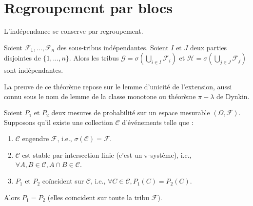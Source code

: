 \section{Regroupement par blocs}
L'indépendance se conserve par regroupement.
\begin{theorem}
Soient $\mathcal{F}_1, \ldots, \mathcal{F}_n$ des sous-tribus indépendantes. Soient $I$ et $J$ deux parties disjointes de $\{1, \ldots, n\}$. Alors les tribus $\mathcal{G} = \sigma(\bigcup_{i \in I} \mathcal{F}_i)$ et $\mathcal{H} = \sigma(\bigcup_{j \in J} \mathcal{F}_j)$ sont indépendantes.
\end{theorem}
La preuve de ce théorème repose sur le lemme d'unicité de l'extension, aussi connu sous le nom de lemme de la classe monotone ou théorème $\pi-\lambda$ de Dynkin.
\begin{lemma}
Soient $P_1$ et $P_2$ deux mesures de probabilité sur un espace mesurable $(\Omega, \mathcal{F})$. Supposons qu'il existe une collection $\mathcal{C}$ d'événements telle que :
\begin{enumerate}
    \item[i)] $\mathcal{C}$ engendre $\mathcal{F}$, i.e., $\sigma(\mathcal{C}) = \mathcal{F}$.
    \item[ii)] $\mathcal{C}$ est stable par intersection finie (c'est un $\pi$-système), i.e., $\forall A, B \in \mathcal{C}, A \cap B \in \mathcal{C}$.
    \item[iii)] $P_1$ et $P_2$ coïncident sur $\mathcal{C}$, i.e., $\forall C \in \mathcal{C}, P_1(C) = P_2(C)$.
\end{enumerate}
Alors $P_1 = P_2$ (elles coïncident sur toute la tribu $\mathcal{F}$).
\end{lemma}

